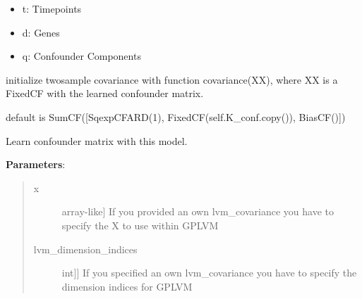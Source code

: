 \documentclass[letterpaper,10pt,english]{sphinxmanual}
\begin{document}
\begin{fulllineitems}
\begin{description}
\begin{itemize}
\item {} 
t: Timepoints

\item {} 
d: Genes

\item {} 
q: Confounder Components

\end{itemize}

\end{description}

\begin{fulllineitems}
\label{base:gptwosample.confounder.confounder.TwoSampleConfounder.initialize_twosample_covariance}
initialize twosample covariance with function covariance(XX), where XX
is a FixedCF with the learned confounder matrix.

default is SumCF({[}SqexpCFARD(1), FixedCF(self.K\_conf.copy()), BiasCF(){]})

\end{fulllineitems}


\begin{fulllineitems}
\label{base:gptwosample.confounder.confounder.TwoSampleConfounder.learn_confounder_matrix}
Learn confounder matrix with this model.

\textbf{Parameters}:
\begin{quote}
\begin{description}
\item[{x}] \leavevmode{[}array-like{]}
If you provided an own lvm\_covariance you have to specify
the X to use within GPLVM

\item[{lvm\_dimension\_indices}] \leavevmode{[}{[}int{]}{]}
If you specified an own lvm\_covariance you have to specify
the dimension indices for GPLVM


\end{description}
\end{quote}
\end{fulllineitems}
\end{fulllineitems}
\end{document}
